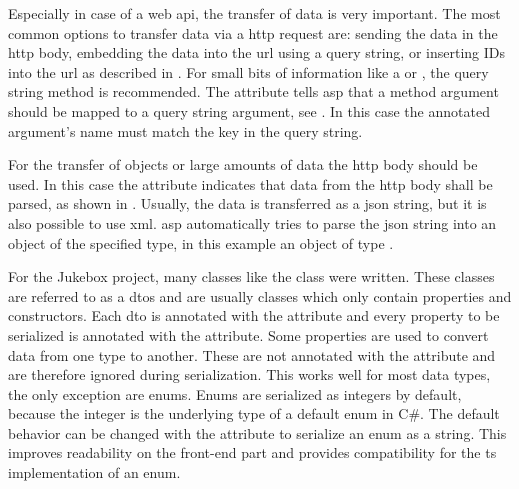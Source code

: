 
Especially in case of a web \gls{api}, the transfer of data is very important. The most common options to transfer data via a \gls{http} request are: sending the data in the \gls{http} body, embedding the data into the \gls{url} using a query string, or inserting IDs into the \gls{url} as described in . For small bits of information like a  or , the query string method is recommended. The \lstcode{[FromQuery]} attribute tells \gls{asp} that a method argument should be mapped to a query string argument, see . In this case the annotated argument's name must match the key in the query string.

For the transfer of objects or large amounts of data the \gls{http} body should be used. In this case the \lstcode{[FromBody]} attribute indicates that data from the \gls{http} body shall be parsed, as shown in . Usually, the data is transferred as a \gls{json} string, but it is also possible to use \gls{xml}. \gls{asp} automatically tries to parse the \gls{json} string into an object of the specified type, in this example an object of type .


For the Jukebox project, many classes like the  class were written. These classes are referred to as a \glspl{dto} and are usually  classes which only contain properties and constructors. Each \gls{dto} is annotated with the \lstcode{[DataContract]} attribute and every property to be serialized is annotated with the \lstcode{[DataMember]} attribute. Some properties are used to convert data from one type to another. These are not annotated with the \lstcode{[DataMember]} attribute and are therefore ignored during serialization. This works well for most data types, the only exception are enums. Enums are serialized as integers by default, because the integer is the underlying type of a default enum in C\#. The default behavior can be changed with the  attribute to serialize an enum as a string. This improves readability on the front-end part and provides compatibility for the \gls{ts} implementation of an enum. \cite{mvcModelBinding}


